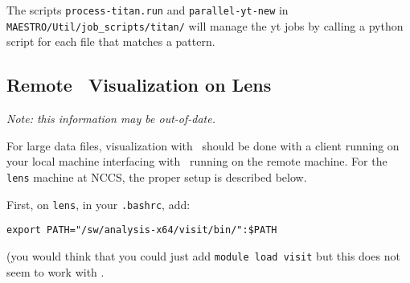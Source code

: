 The scripts {\tt process-titan.run} and {\tt parallel-yt-new} in
{\tt MAESTRO/Util/job\_scripts/titan/} will manage the yt jobs
by calling a python script for each file that matches a pattern.


\subsection{Remote \visit\ Visualization on Lens}

{\em Note: this information may be out-of-date.}

For large data files, visualization with \visit\ should be done with
a client running on your local machine interfacing with \visit\ running
on the remote machine.  For the {\tt lens} machine at NCCS, the proper setup
is described below.

First, on {\tt lens}, in your {\tt .bashrc}, add:
\begin{verbatim}
export PATH="/sw/analysis-x64/visit/bin/":$PATH
\end{verbatim}
(you would think that you could just add {\tt module load visit} but this
does not seem to work with \visit.

